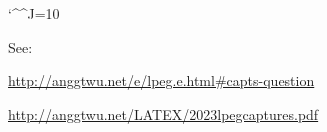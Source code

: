 \documentclass[oneside,12pt]{article}
\begin{document}

\def\drafturl{http://anggtwu.net/LATEX/2023-2-C2.pdf}
\def\drafturl{http://anggtwu.net/2023.2-C2.html}
\def\drafturl{http://anggtwu.net/LATEX/2023lpegcaptures.pdf}
\def\draftfooter{\tiny \href{\drafturl}{\jobname{}} \ColorBrown{\shorttoday{} \hours}}


\catcode`\^^J=10

\pu

\def\und#1#2{\underbrace{#1}_{#2}}

See:

\url{http://anggtwu.net/e/lpeg.e.html\#capts-question}

\url{http://anggtwu.net/LATEX/2023lpegcaptures.pdf}

\bsk
\bsk


$\begin{array}{l}
 \ga{P_1}  \\ \\
 \ga{C_1}  \\ \\
 \ga{Cs_1}  \\ \\
 \ga{Cc_1} \\ \\
 \end{array}
$

\newpage

$\begin{array}{l}
 \ga{Cg_1} \\ \\
 \ga{Cg_2} \\ \\
 \ga{Cg_3} \\ \\
 \ga{Cg_4} \\ \\
 \end{array}
$

\newpage

$\begin{array}{l}
 \ga{Cb_1} \\ \\
 \ga{Cb_2} \\ \\
 \ga{Cb_3} \\ \\
 \ga{Cb_4}
 \end{array}
$






\newpage


\end{document}
